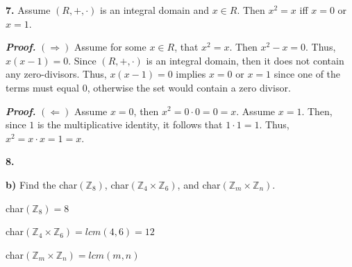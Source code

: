 \documentclass[12pt, a4paper]{article}
\begin{document}
\vspace{6mm}

\noindent\textbf{7.} Assume $(R,+,\cdot)$ is an integral domain and $x\in R$. Then $x^2=x$ iff $x=0$ or $x=1$.

\vspace{4mm}

\begin{addmargin}[1.5em]{1.5em}

    \noindent\textbf{\textit{Proof.}} $(\Rightarrow)$ Assume for some $x\in R$, that $x^2=x$. Then $x^2-x=0$. Thus, $x(x-1)=0$. Since $(R,+,\cdot)$ is an integral domain, then it does not contain any zero-divisors. Thus, $x(x-1)=0$ implies $x=0$ or $x=1$ since one of the terms must equal $0$, otherwise the set would contain a zero divisor.\hspace{44mm}\square
    
    \vspace{4mm}
    
\end{addmargin}

\begin{addmargin}[1.5em]{1.5em}
    
    \textbf{\textit{Proof.}} $(\Leftarrow)$ Assume $x=0$, then $x^2=0\cdot 0=0=x$. Assume $x=1$. Then, since $1$ is the multiplicative identity, it follows that $1\cdot 1=1$. Thus, $x^2=x\cdot x=1=x$.\hspace{1mm}\square 

\end{addmargin}

\newpage

\noindent\textbf{8.}\par

\begin{addmargin}[1.5em]{1.5em}

    \noindent\textbf{b)} Find the char$(\mathbb{Z}_8)$, char$(\mathbb{Z}_4\times\mathbb{Z}_6)$, and char$(\mathbb{Z}_m\times\mathbb{Z}_n)$.
    
    \vspace{4mm}
    
    char$(\mathbb{Z}_8)=8$\par
    char$(\mathbb{Z}_4\times\mathbb{Z}_6)=lcm(4,6)=12$\par
    char$(\mathbb{Z}_m\times\mathbb{Z}_n)=lcm(m,n)$
    
\end{addmargin}

\vspace{4mm}
\end{document}
